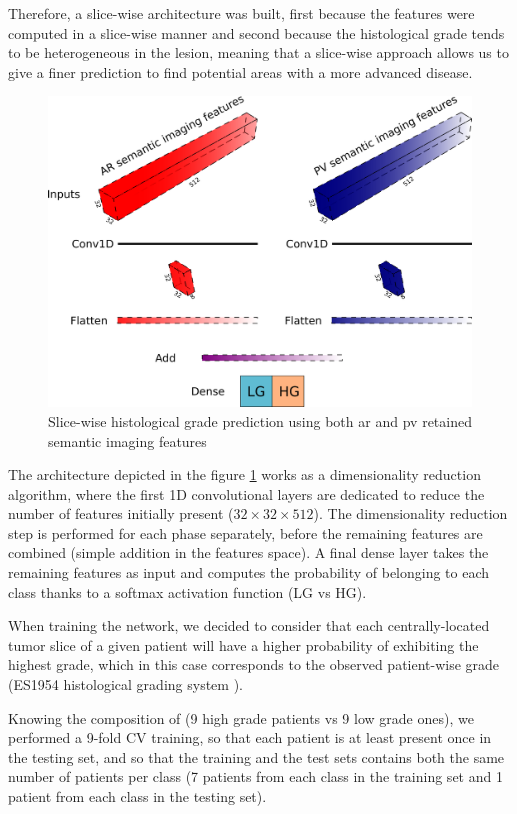 Therefore, a slice-wise architecture was built, first because the
features were computed in a slice-wise manner and second because the
histological grade tends to be heterogeneous in the lesion, meaning that
a slice-wise approach allows us to give a finer prediction to find
potential areas with a more advanced disease.


\begin{figure}[th!]
\centering
\includegraphics[width=0.9\linewidth]{images/gradpredictionArchitecture}
\caption{Slice-wise histological grade prediction using both \ac{ar} and \ac{pv} retained semantic imaging features}
\label{fig:gradpredictionArchitecture}
\end{figure}



The architecture depicted in the figure \ref{fig:gradpredictionArchitecture} works as a dimensionality
reduction algorithm, where the first 1D convolutional layers are dedicated to
reduce the number of features initially present ($ 32\times32\times512 $). The
dimensionality reduction step is performed for each phase separately,
before the remaining features are combined (simple addition in the
features space).
A final dense layer takes the remaining features as input and computes
the probability of belonging to each class thanks to a softmax activation
function (LG vs HG).

When training the network, we decided to consider that each
centrally-located tumor slice of a given patient will have a higher
probability of exhibiting the highest grade, which in this case
corresponds to the observed patient-wise grade (ES1954 histological grading system \cite{EdmondsonHA1954}).

Knowing the composition of  (9 high grade patients vs 9 low
grade ones), we performed a 9-fold CV training, so that each patient is
at least present once in the testing set, and so that the training and
the test sets contains both the same number of patients per
class (7 patients from each class in the training set and 1 patient from
each class in the testing set).

